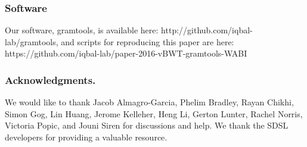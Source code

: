 \documentclass[runningheads,a4paper]{llncs}
\begin{document}
\subsubsection{Software}
Our software, gramtools, is available here: http://github.com/iqbal-lab/gramtools, and scripts for reproducing this paper are here: https://github.com/iqbal-lab/paper-2016-vBWT-gramtools-WABI

\subsubsection*{Acknowledgments.} We would like to thank Jacob Almagro-Garcia, Phelim Bradley, Rayan Chikhi, Simon Gog, Lin Huang, Jerome Kelleher, Heng Li,  Gerton Lunter, Rachel Norris, Victoria Popic, and Jouni Siren   for discussions and help. We thank the SDSL developers for providing a valuable  resource.
\end{document}
